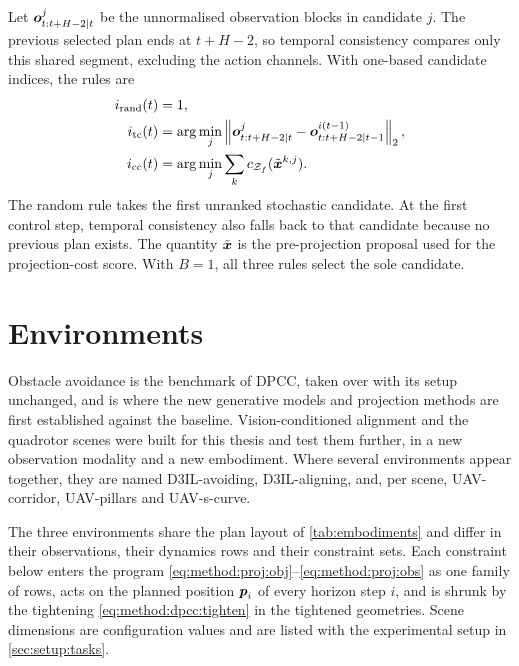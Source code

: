 Let $\boldsymbol{o}^{j}_{t:t+H-2|t}$ be the unnormalised observation blocks in candidate $j$.
The previous selected plan ends at $t+H-2$, so temporal consistency compares only this shared
segment, excluding the action channels. With one-based candidate indices, the rules are
\begin{equation}\label{eq:method:sel:rules}
\begin{aligned}
  i_{\textrm{rand}}(t)&=1,\\
  i_{\textrm{tc}}(t)&=\arg\min_j\left\|\boldsymbol{o}^{j}_{t:t+H-2|t}
                -\boldsymbol{o}^{i(t-1)}_{t:t+H-2|t-1}\right\|_2,\\
  i_{\textrm{cc}}(t)&=\arg\min_j\sum_k c_{\mathcal{Z}_f}(\tilde{\boldsymbol{x}}^{k,j}).
\end{aligned}
\end{equation}
The random rule takes the first unranked stochastic candidate. At the first control step, temporal
consistency also falls back to that candidate because no previous plan exists. The quantity
$\tilde{\boldsymbol{x}}$ is the pre-projection proposal used for the projection-cost score. With $B=1$,
all three rules select the sole candidate.

\section{Environments}\label{sec:method:envs}

Obstacle avoidance is the
benchmark of \ac{DPCC}, taken over with its setup unchanged, and is where the new generative models
and projection methods are first established against the baseline. Vision-conditioned alignment and the
quadrotor scenes were built for this thesis and test them further, in a new observation modality and a
new embodiment. Where several environments appear together, they are named D3IL-avoiding,
D3IL-aligning, and, per scene, UAV-corridor, UAV-pillars and UAV-s-curve.

The three environments share the plan layout of \autoref{tab:embodiments} and differ in their
observations, their dynamics rows and their constraint sets. Each constraint below enters the program
\eqref{eq:method:proj:obj}--\eqref{eq:method:proj:obs} as one family of rows, acts on the planned
position $\boldsymbol{p}_{i}$ of every horizon step $i$, and is shrunk by the tightening
\eqref{eq:method:dpcc:tighten} in the tightened geometries. Scene dimensions are configuration values and
are listed with the experimental setup in \autoref{sec:setup:tasks}.

